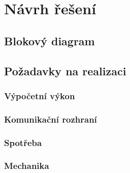 \chapter{Návrh řešení}
\section{Blokový diagram}
\section{Požadavky na realizaci}
	\subsection{Výpočetní výkon}
	\subsection{Komunikační rozhraní}
	\subsection{Spotřeba}
	\subsection{Mechanika}